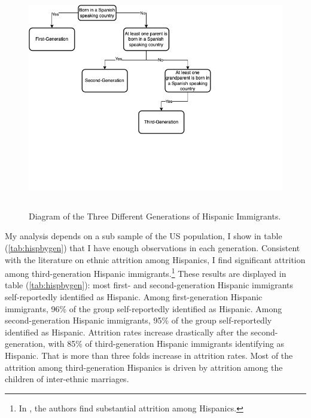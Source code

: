 \documentclass[12pt, fullpage]{article}
\begin{document}
\begin{center}
\begin{figure}[H]
\caption{Diagram of the Three Different Generations of Hispanic Immigrants.}
\includegraphics[width=\textwidth, height=9cm]{figure/diag.png} 
\label{fig:diag}
\end{figure}
\hfill%
\end{center}

My analysis depends on a sub sample of the US population, I show in table (\ref{tab:hispbygen}) that I have enough observations in each generation. Consistent with the literature on ethnic attrition among Hispanics, I find significant attrition among third-generation Hispanic immigrants.\footnote{In \citet{duncanIdentifyingLaterGenerationDescendants2018,duncanSocioeconomicIntegrationImmigrant2018, antmanEthnicAttritionObserved2016,antmanEthnicAttritionAssimilation2020}, the authors find substantial attrition among Hispanics.} These results are displayed in table (\ref{tab:hispbygen}): most first- and second-generation Hispanic immigrants self-reportedly identified as Hispanic. Among first-generation Hispanic immigrants, 96\% of the group self-reportedly identified as Hispanic. Among second-generation Hispanic immigrants, 95\% of the group self-reportedly identified as Hispanic. Attrition rates increase drastically after the second-generation, with 85\% of third-generation Hispanic immigrants identifying as Hispanic. That is more than three folds increase in attrition rates. Most of the attrition among third-generation Hispanics is driven by attrition among the children of inter-ethnic marriages.


\end{document}
